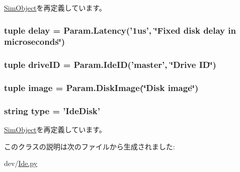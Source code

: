 \hyperlink{classm5_1_1SimObject_1_1SimObject_a17da7064bc5c518791f0c891eff05fda}{SimObject}を再定義しています。\hypertarget{classIde_1_1IdeDisk_ac1ab55b34347f0110eb273c9d47d52e2}{
\subsubsection[{delay}]{\setlength{\rightskip}{0pt plus 5cm}tuple {\bf delay} = Param.Latency('1us', \char`\"{}Fixed disk delay in microseconds\char`\"{})}}
\label{classIde_1_1IdeDisk_ac1ab55b34347f0110eb273c9d47d52e2}
\hypertarget{classIde_1_1IdeDisk_a4f6e363c9347706a2256af613a15687c}{
\subsubsection[{driveID}]{\setlength{\rightskip}{0pt plus 5cm}tuple {\bf driveID} = Param.IdeID('master', \char`\"{}Drive ID\char`\"{})}}
\label{classIde_1_1IdeDisk_a4f6e363c9347706a2256af613a15687c}
\hypertarget{classIde_1_1IdeDisk_a19b24a8d47d783aaa13170884d6a25c2}{
\subsubsection[{image}]{\setlength{\rightskip}{0pt plus 5cm}tuple {\bf image} = Param.DiskImage(\char`\"{}Disk {\bf image}\char`\"{})}}
\label{classIde_1_1IdeDisk_a19b24a8d47d783aaa13170884d6a25c2}
\hypertarget{classIde_1_1IdeDisk_acce15679d830831b0bbe8ebc2a60b2ca}{
\subsubsection[{type}]{\setlength{\rightskip}{0pt plus 5cm}string {\bf type} = '{\bf IdeDisk}'}}
\label{classIde_1_1IdeDisk_acce15679d830831b0bbe8ebc2a60b2ca}


\hyperlink{classm5_1_1SimObject_1_1SimObject_acce15679d830831b0bbe8ebc2a60b2ca}{SimObject}を再定義しています。

このクラスの説明は次のファイルから生成されました:\begin{DoxyCompactItemize}
\item 
dev/\hyperlink{Ide_8py}{Ide.py}\end{DoxyCompactItemize}
